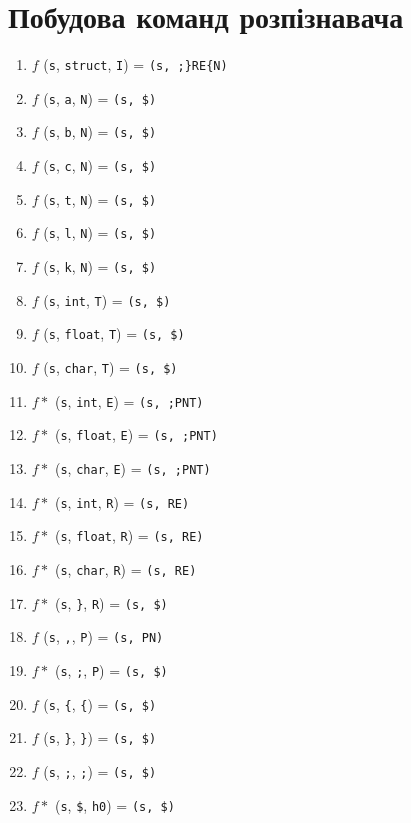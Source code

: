 \newpage
\section{Побудова команд розпізнавача}
\begin{enumerate}
    \item  $f$  (\verb|s|,  \verb|struct|,  \verb|I|)       = \verb|(s, ;}RE{N)|\
    \item  $f$  (\verb|s|,  \verb|a|,       \verb|N|)       = \verb|(s, $)|\
    \item  $f$  (\verb|s|,  \verb|b|,       \verb|N|)       = \verb|(s, $)|\
    \item  $f$  (\verb|s|,  \verb|c|,       \verb|N|)       = \verb|(s, $)|\
    \item  $f$  (\verb|s|,  \verb|t|,       \verb|N|)       = \verb|(s, $)|\
    \item  $f$  (\verb|s|,  \verb|l|,       \verb|N|)       = \verb|(s, $)|\
    \item  $f$  (\verb|s|,  \verb|k|,       \verb|N|)       = \verb|(s, $)|\
    \item  $f$  (\verb|s|,  \verb|int|,     \verb|T|)       = \verb|(s, $)|\
    \item  $f$  (\verb|s|,  \verb|float|,   \verb|T|)       = \verb|(s, $)|\
    \item  $f$  (\verb|s|,  \verb|char|,    \verb|T|)       = \verb|(s, $)|\
    \item  $f*$ (\verb|s|,  \verb|int|,     \verb|E|)       = \verb|(s, ;PNT)|\
    \item  $f*$ (\verb|s|,  \verb|float|,   \verb|E|)       = \verb|(s, ;PNT)|\
    \item  $f*$ (\verb|s|,  \verb|char|,    \verb|E|)       = \verb|(s, ;PNT)|\
    \item  $f*$ (\verb|s|,  \verb|int|,     \verb|R|)       = \verb|(s, RE)|\
    \item  $f*$ (\verb|s|,  \verb|float|,   \verb|R|)       = \verb|(s, RE)|\
    \item  $f*$ (\verb|s|,  \verb|char|,    \verb|R|)       = \verb|(s, RE)|\
    \item  $f*$ (\verb|s|,  \verb|}|,       \verb|R|)       = \verb|(s, $)|\
    \item  $f$  (\verb|s|,  \verb|,|,       \verb|P|)       = \verb|(s, PN)|\
    \item  $f*$ (\verb|s|,  \verb|;|,       \verb|P|)       = \verb|(s, $)|\

    \item  $f$  (\verb|s|,  \verb|{|,       \verb|{|)       = \verb|(s, $)|\
    \item  $f$  (\verb|s|,  \verb|}|,       \verb|}|)       = \verb|(s, $)|\
    \item  $f$  (\verb|s|,  \verb|;|,       \verb|;|)       = \verb|(s, $)|\
    \item  $f*$ (\verb|s|,  \verb|$|,       \verb|h0|)      = \verb|(s, $)|\

\end{enumerate}

